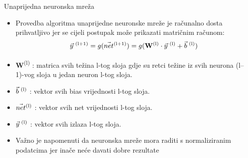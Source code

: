 \documentclass{beamer}
\begin{document}
        \begin{frame}{Unaprijedna neuronska mreža}
             \begin{itemize}
                \item Provedba algoritma unaprijedne neuronske mreže je računalno dosta prihvatljivo jer se cijeli postupak može prikazati matričnim računom: \smallskip
                \[\Vec{y}\textsuperscript{ (l+1)} = g(\Vec{net}\textsuperscript{(l+1)}) = g(\textbf{W}\textsuperscript{(l)} \cdot \Vec{y}\textsuperscript{ (l)} + \Vec{b}\textsuperscript{ (l)})\]
                \item \textbf{W}\textsuperscript{(l)} : matrica svih težina l-tog sloja gdje su retci težine iz svih neurona (l--1)-vog sloja u jedan neuron l-tog sloja.
                \item $\Vec{b}\textsuperscript{ (l)}$ : vektor svih bias vrijednosti l-tog sloja.
                \item $\Vec{net}\textsuperscript{(l)}$ : vektor svih net vrijednosti l-tog sloja.
                \item $\Vec{y}\textsuperscript{ (l)}$ : vektor svih izlaza l-tog sloja.
                \smallskip
                \item Važno je napomenuti da neuronska mreže mora raditi s normaliziranim podatcima jer inače neće davati dobre rezultate
             \end{itemize}
        \end{frame}
    
\end{document}

